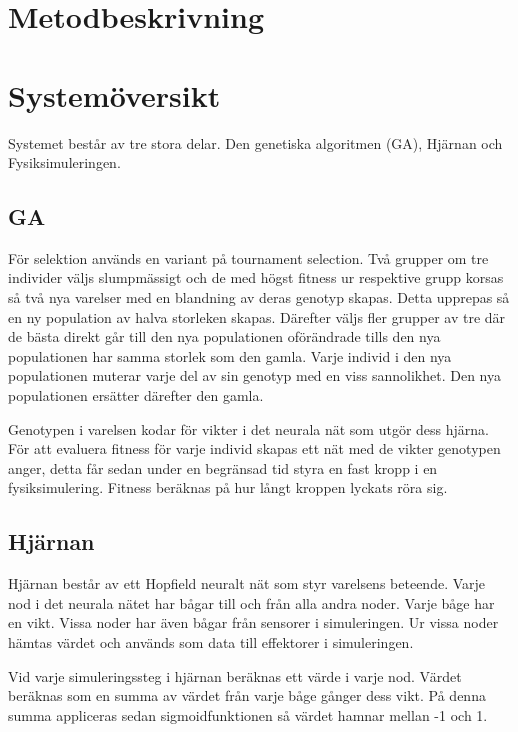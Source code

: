 \documentclass[titlepage, a4paper, 12pt]{article}
\begin{document}
\section{Metodbeskrivning}

\section{Systemöversikt}
Systemet består av tre stora delar. Den genetiska algoritmen (GA), Hjärnan och Fysiksimuleringen. 

	\subsection{GA}
	För selektion används en variant på tournament selection. Två grupper om tre individer väljs slumpmässigt och de med högst fitness ur respektive grupp korsas så två nya varelser med en blandning av deras genotyp skapas. Detta upprepas så en ny population av halva storleken skapas. Därefter väljs fler grupper av tre där de bästa direkt går till den nya populationen oförändrade tills den nya populationen har samma storlek som den gamla. Varje individ i den nya populationen muterar varje del av sin genotyp med en viss sannolikhet. Den nya populationen ersätter därefter den gamla. 
		
	Genotypen i varelsen kodar för vikter i det neurala nät som utgör dess hjärna. För att evaluera fitness för varje individ skapas ett nät med de vikter genotypen anger, detta får sedan under en begränsad tid styra en fast kropp i en fysiksimulering. Fitness beräknas på hur långt kroppen lyckats röra sig.
		
	\subsection{Hjärnan}
	Hjärnan består av ett Hopfield neuralt nät som styr varelsens beteende. Varje nod i det neurala nätet har bågar till och från alla andra noder. Varje båge har en vikt. Vissa noder har även bågar från sensorer i simuleringen. Ur vissa noder hämtas värdet och används som data till effektorer i simuleringen. 

	Vid varje simuleringssteg i hjärnan beräknas ett värde i varje nod. Värdet beräknas som en summa av värdet från varje båge gånger dess vikt. På denna summa appliceras sedan sigmoidfunktionen så värdet hamnar mellan -1 och 1. 
\end{document}
